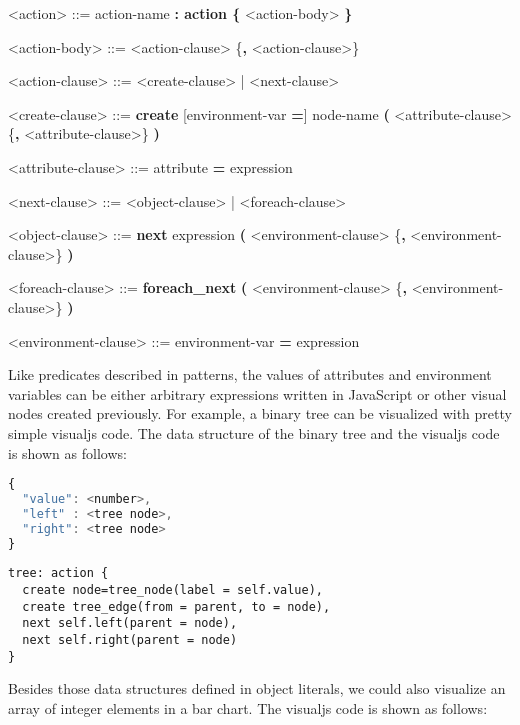 \begin{center}
  \begin{minipage}{0.8\linewidth}
    \begin{grammar}
      <action> ::= action-name \textbf{: action \{} <action-body> \textbf{\}}

      <action-body> ::= <action-clause> \{\textbf{,} <action-clause>\}

      <action-clause> ::= <create-clause> | <next-clause>

      <create-clause> ::= \textbf{create} [environment-var \textbf{=}] node-name \textbf{(} <attribute-clause> \{\textbf{,} <attribute-clause>\} \textbf{)}

      <attribute-clause> ::= attribute \textbf{=} expression

      <next-clause> ::= <object-clause> | <foreach-clause>

      <object-clause> ::= \textbf{next} expression \textbf{(} <environment-clause> \{\textbf{,} <environment-clause>\} \textbf{)}

      <foreach-clause> ::= \textbf{foreach\_next} \textbf{(} <environment-clause> \{\textbf{,} <environment-clause>\} \textbf{)}

      <environment-clause> ::= environment-var \textbf{=} expression
    \end{grammar}
  \end{minipage}
\end{center}

Like predicates described in patterns, the values of attributes and environment variables can be either arbitrary expressions written in JavaScript or other visual nodes created previously. For example, a binary tree can be visualized with pretty simple visualjs code. The data structure of the binary tree and the visualjs code is shown as follows:

\begin{lstlisting}[language=JavaScript]
{
  "value": <number>,
  "left" : <tree node>,
  "right": <tree node>
}
\end{lstlisting}

\begin{lstlisting}
tree: action {
  create node=tree_node(label = self.value),
  create tree_edge(from = parent, to = node),
  next self.left(parent = node),
  next self.right(parent = node)
}
\end{lstlisting}

Besides those data structures defined in object literals, we could also visualize an array of integer elements in a bar chart. The visualjs code is shown as follows:

